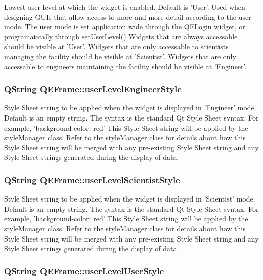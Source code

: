 Lowest user level at which the widget is enabled. Default is 'User'. Used when designing GUIs that allow access to more and more detail according to the user mode. The user mode is set application wide through the \hyperlink{classQELogin}{QELogin} widget, or programatically through setUserLevel() Widgets that are always accessable should be visible at 'User'. Widgets that are only accessable to scientists managing the facility should be visible at 'Scientist'. Widgets that are only accessable to engineers maintaining the facility should be visible at 'Engineer'. \hypertarget{classQEFrame_ade723579d535f116cf0611d001c7bfb3}{
\subsubsection[{userLevelEngineerStyle}]{\setlength{\rightskip}{0pt plus 5cm}QString QEFrame::userLevelEngineerStyle}}
\label{classQEFrame_ade723579d535f116cf0611d001c7bfb3}
Style Sheet string to be applied when the widget is displayed in 'Engineer' mode. Default is an empty string. The syntax is the standard Qt Style Sheet syntax. For example, 'background-\/color: red' This Style Sheet string will be applied by the styleManager class. Refer to the styleManager class for details about how this Style Sheet string will be merged with any pre-\/existing Style Sheet string and any Style Sheet strings generated during the display of data. \hypertarget{classQEFrame_a9de22693918199d7eb8ee743ecae1110}{
\subsubsection[{userLevelScientistStyle}]{\setlength{\rightskip}{0pt plus 5cm}QString QEFrame::userLevelScientistStyle}}
\label{classQEFrame_a9de22693918199d7eb8ee743ecae1110}
Style Sheet string to be applied when the widget is displayed in 'Scientist' mode. Default is an empty string. The syntax is the standard Qt Style Sheet syntax. For example, 'background-\/color: red' This Style Sheet string will be applied by the styleManager class. Refer to the styleManager class for details about how this Style Sheet string will be merged with any pre-\/existing Style Sheet string and any Style Sheet strings generated during the display of data. \hypertarget{classQEFrame_a71f5eed86516183bed1d51189e954bdc}{
\subsubsection[{userLevelUserStyle}]{\setlength{\rightskip}{0pt plus 5cm}QString QEFrame::userLevelUserStyle}}
